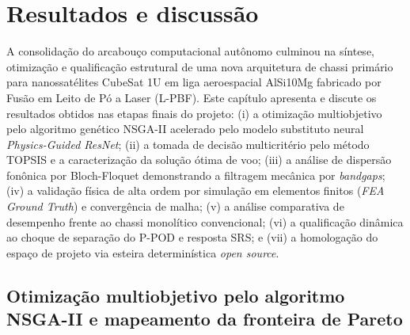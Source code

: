 \chapter{Resultados e discussão}
\label{cap:resultados}

A consolidação do arcabouço computacional autônomo culminou na síntese, otimização e qualificação estrutural de uma nova arquitetura de chassi primário para nanossatélites CubeSat 1U em liga aeroespacial AlSi10Mg fabricado por Fusão em Leito de Pó a Laser (L-PBF). Este capítulo apresenta e discute os resultados obtidos nas etapas finais do projeto: (i) a otimização multiobjetivo pelo algoritmo genético NSGA-II acelerado pelo modelo substituto neural \textit{Physics-Guided ResNet}; (ii) a tomada de decisão multicritério pelo método TOPSIS e a caracterização da solução ótima de voo; (iii) a análise de dispersão fonônica por Bloch-Floquet demonstrando a filtragem mecânica por \textit{bandgaps}; (iv) a validação física de alta ordem por simulação em elementos finitos (\textit{FEA Ground Truth}) e convergência de malha; (v) a análise comparativa de desempenho frente ao chassi monolítico convencional; (vi) a qualificação dinâmica ao choque de separação do P-POD e resposta SRS; e (vii) a homologação do espaço de projeto via esteira determinística \textit{open source}.

\section{Otimização multiobjetivo pelo algoritmo NSGA-II e mapeamento da fronteira de Pareto}
\label{sec:nsga}

